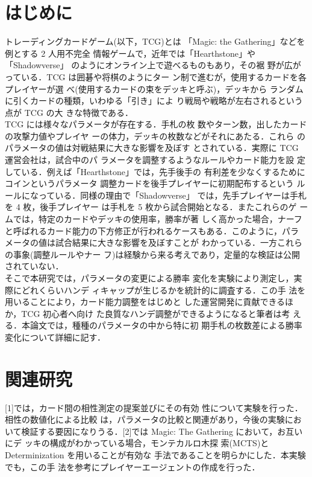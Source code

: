 \documentclass[twocolumn]{ltjsarticle}
\begin{document}
\section{はじめに}
\small{
  トレーディングカードゲーム(以下，TCG)とは
「Magic: the Gathering」などを例とする 2 人用不完全
情報ゲームで，近年では「Hearthstone」や「Shadowverse」
のようにオンライン上で遊べるものもあり，その裾
野が広がっている．TCG は囲碁や将棋のようにター
ン制で進むが，使用するカードを各プレイヤーが選
べ(使用するカードの束をデッキと呼ぶ)，デッキから
ランダムに引くカードの種類，いわゆる「引き」によ
り戦局や戦略が左右されるという点が TCG の大
きな特徴である．
\\ TCG には様々なパラメータが存在する．手札の枚
数やターン数，出したカードの攻撃力値やプレイヤ
ーの体力，デッキの枚数などがそれにあたる．これら
のパラメータの値は対戦結果に大きな影響を及ぼす
とされている．実際に TCG 運営会社は，試合中のパ
ラメータを調整するようなルールやカード能力を設
定している．例えば「Hearthstone」では，先手後手の
有利差を少なくするためにコインというパラメータ
調整カードを後手プレイヤーに初期配布するという
ルールになっている．同様の理由で「Shadowverse」
では，先手プレイヤーは手札を 4 枚，後手プレイヤー
は手札を 5 枚から試合開始となる．またこれらのゲ
ームでは，特定のカードやデッキの使用率，勝率が著
しく高かった場合，ナーフと呼ばれるカード能力の下方修正が行われるケースもある．このように，パラ
メータの値は試合結果に大きな影響を及ぼすことが
わかっている．一方これらの事象(調整ルールやナー
フ)は経験から来る考えであり，定量的な検証は公開
されていない．
\\ そこで本研究では，パラメータの変更による勝率
変化を実験により測定し，実際にどれくらいハンデ
ィキャップが生じるかを統計的に調査する．この手
法を用いることにより，カード能力調整をはじめと
した運営開発に貢献できるほか，TCG 初心者へ向け
た良質なハンデ調整ができるようになると筆者は考
える．本論文では，種種のパラメータの中から特に初
期手札の枚数差による勝率変化について詳細に記す．
}

\section{関連研究}
\small{
  [1]では，カード間の相性測定の提案並びにその有効
性について実験を行った．相性の数値化による比較
は，パラメータの比較と関連があり，今後の実験にお
いて検証する要因になりうる．[2]では Magic: The Gathering において，お互いにデ
ッキの構成がわかっている場合，モンテカルロ木探
索(MCTS)と Determinization を用いることが有効な
手法であることを明らかにした．本実験でも，この手
法を参考にプレイヤーエージェントの作成を行った．
}

\end{document}
